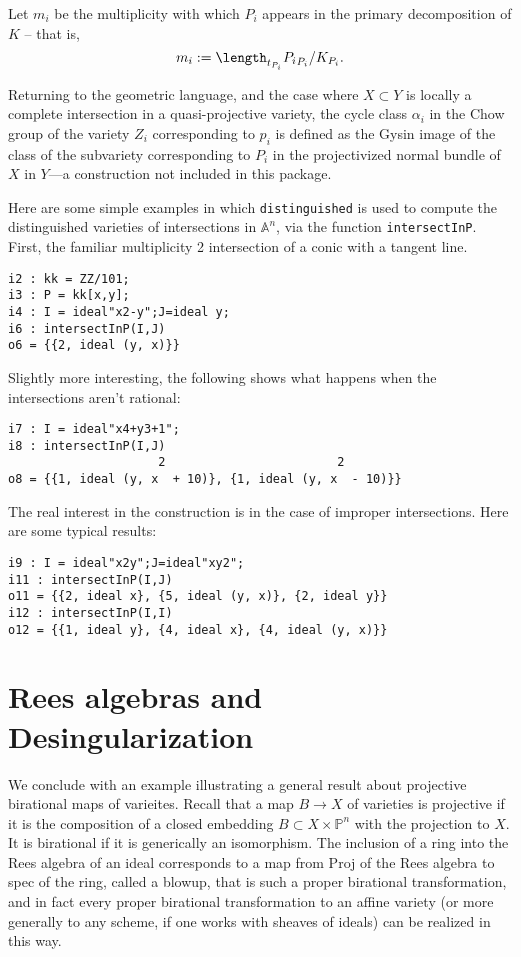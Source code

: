 \documentclass[twoside,12pt, leqno]{amsart}
\def\PP{{\mathbb P}}
\begin{document}
Let $m_{i}$ be the multiplicity with which $P_{i}$ appears in the primary decomposition of $K$ -- that is,
$$
m_{i} := \length_{t_{P_{i}}}{P_{i}}_{P_{i}}/K_{P_{i}}.
$$

Returning to the geometric language, and the case where $X\subset Y$ is locally a complete intersection in a quasi-projective variety, the cycle class $\alpha_{i}$ in the Chow group of the variety 
$Z_{i}$ corresponding to $p_{i}$ is defined as the Gysin image of the class of the subvariety corresponding
to $P_{i}$ in the projectivized normal bundle of $X$ in $Y$---a construction not included in this package. 

Here are some simple examples in which {\tt distinguished} is used to compute the distinguished varieties of
intersections in ${\mathbb A}^{n}$, via the function {\tt intersectInP}. First, the familiar multiplicity 2 intersection of a conic with a tangent line.
\begin{footnotesize}
 \begin{verbatim}
i2 : kk = ZZ/101;
i3 : P = kk[x,y];
i4 : I = ideal"x2-y";J=ideal y;
i6 : intersectInP(I,J)
o6 = {{2, ideal (y, x)}}
\end{verbatim}
\end{footnotesize}
Slightly more interesting, the following shows what happens when the intersections aren't rational:
\begin{footnotesize}
 \begin{verbatim}
i7 : I = ideal"x4+y3+1";
i8 : intersectInP(I,J)
                     2                        2
o8 = {{1, ideal (y, x  + 10)}, {1, ideal (y, x  - 10)}}
\end{verbatim}
\end{footnotesize}
The real interest in the construction is in the case of improper intersections. Here are some typical results:
\begin{footnotesize}
 \begin{verbatim}
i9 : I = ideal"x2y";J=ideal"xy2";
i11 : intersectInP(I,J)
o11 = {{2, ideal x}, {5, ideal (y, x)}, {2, ideal y}}
i12 : intersectInP(I,I)
o12 = {{1, ideal y}, {4, ideal x}, {4, ideal (y, x)}}
\end{verbatim}
\end{footnotesize}

\section{Rees algebras and Desingularization}

We conclude with an example illustrating a general result about projective birational maps of varieites.
Recall that a map $B\to X$ of varieties is projective if it is the composition of a closed embedding $B\subset X\times \PP^n$ with the projection to $X$.
It is birational if it is generically an isomorphism. The inclusion of a ring into the Rees algebra
of an ideal corresponds to a map from Proj of the Rees algebra to spec of the ring, called a blowup, that is such a proper birational transformation, and in fact every proper birational transformation to an affine variety (or more generally to any scheme, if one works with sheaves of ideals) can be realized in this way.
\end{document}
